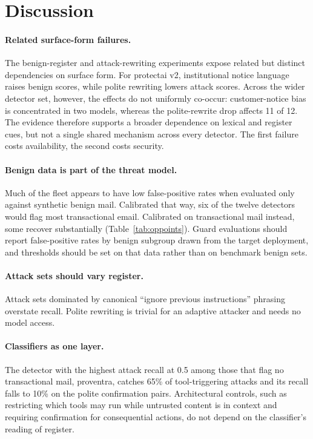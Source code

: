 \documentclass[11pt]{article}
\begin{document}
\section{Discussion}

\paragraph{Related surface-form failures.}
The benign-register and attack-rewriting experiments expose related but distinct dependencies on surface form. For protectai v2, institutional notice language raises benign scores, while polite rewriting lowers attack scores. Across the wider detector set, however, the effects do not uniformly co-occur: customer-notice bias is concentrated in two models, whereas the polite-rewrite drop affects 11 of 12. The evidence therefore supports a broader dependence on lexical and register cues, but not a single shared mechanism across every detector. The first failure costs availability, the second costs security.

\paragraph{Benign data is part of the threat model.}
Much of the fleet appears to have low false-positive rates when evaluated only against synthetic benign mail. Calibrated that way, six of the twelve detectors would flag most transactional email. Calibrated on transactional mail instead, some recover substantially (Table~\ref{tab:oppoints}). Guard evaluations should report false-positive rates by benign subgroup drawn from the target deployment, and thresholds should be set on that data rather than on benchmark benign sets.

\paragraph{Attack sets should vary register.}
Attack sets dominated by canonical ``ignore previous instructions'' phrasing overstate recall. Polite rewriting is trivial for an adaptive attacker and needs no model access.

\paragraph{Classifiers as one layer.}
The detector with the highest attack recall at 0.5 among those that flag no transactional mail, proventra, catches 65\% of tool-triggering attacks and its recall falls to 10\% on the polite confirmation pairs. Architectural controls, such as restricting which tools may run while untrusted content is in context and requiring confirmation for consequential actions, do not depend on the classifier's reading of register.
\end{document}
